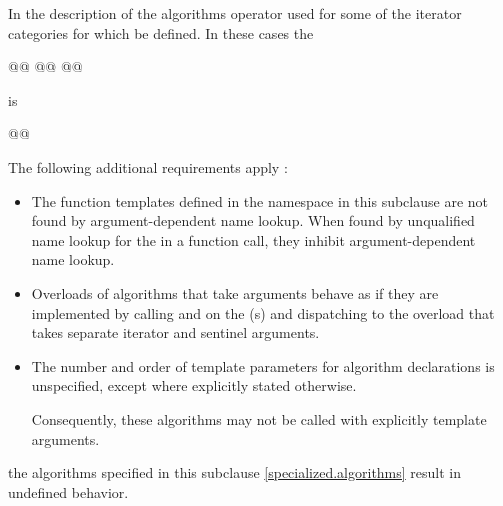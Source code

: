 \begin{addedblock}
\pnum
In the description of the algorithms operator
\tcode{-}
 used for some of the iterator categories for which
  be defined.
In these cases the 

\begin{codeblock}
@@
@@
@@
\end{codeblock}

is 

\begin{codeblock}
@@
\end{codeblock}

\pnum
{}
The following additional requirements apply :
\begin{itemize}
\item The function templates defined in the  namespace
  in this subclause are not found by argument-dependent
  name lookup. When found by
  unqualified name lookup for the
   in a function call, they
  inhibit argument-dependent name lookup.
\item Overloads of algorithms that take  arguments
  behave as if they are implemented by calling 
  and  on the (s) and dispatching to the
  overload that takes separate iterator and sentinel arguments.
\item The number and order of template parameters for algorithm declarations
  is unspecified, except where explicitly stated otherwise.
  \begin{note}
  Consequently, these algorithms may not be called with explicitly template
  arguments.
  \end{note}
\end{itemize}

\pnum
\begin{note}
 the algorithms specified in this
subclause \ref{specialized.algorithms} 
result in undefined behavior.
\end{note}


\end{addedblock}

